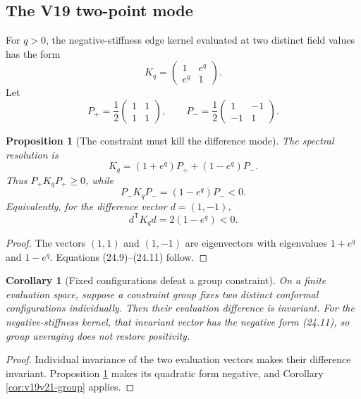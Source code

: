 \documentclass[11pt]{article}
\newtheorem{proposition}[theorem]{Proposition}
\newtheorem{corollary}[theorem]{Corollary}
\theoremstyle{remark}
\begin{document}
\subsection{The V19 two-point mode}

For \(q>0\), the negative-stiffness edge kernel evaluated at two distinct
field values has the form
\[
 K_q=
 \begin{pmatrix}1&e^q\\e^q&1\end{pmatrix}.                    \tag{24.7}
\]
Let
\[
 P_+=\frac12\begin{pmatrix}1&1\\1&1\end{pmatrix},
 \qquad
 P_-=\frac12\begin{pmatrix}1&-1\\-1&1\end{pmatrix}.             \tag{24.8}
\]

\begin{proposition}[The constraint must kill the difference mode]
\label{prop:v19v21-two-point}
The spectral resolution is
\[
 K_q=(1+e^q)P_+ +(1-e^q)P_-.                                  \tag{24.9}
\]
Thus \(P_+K_qP_+\geq0\), while
\[
 P_-K_qP_-=(1-e^q)P_-<0.                                      \tag{24.10}
\]
Equivalently, for the difference vector \(d=(1,-1)\),
\[
 d^{\mathsf T}K_qd=2(1-e^q)<0.                                \tag{24.11}
\]
\end{proposition}

\begin{proof}
The vectors \((1,1)\) and \((1,-1)\) are eigenvectors with eigenvalues
\(1+e^q\) and \(1-e^q\).  Equations (24.9)--(24.11) follow.
\end{proof}

\begin{corollary}[Fixed configurations defeat a group constraint]
\label{cor:v19v21-fixed}
On a finite evaluation space, suppose a constraint group fixes two
distinct conformal configurations individually.  Then their evaluation
difference is invariant.  For the negative-stiffness kernel, that
invariant vector has the negative form (24.11), so group averaging does
not restore positivity.
\end{corollary}

\begin{proof}
Individual invariance of the two evaluation vectors makes their
difference invariant.  Proposition \ref{prop:v19v21-two-point} makes its
quadratic form negative, and Corollary \ref{cor:v19v21-group} applies.
\end{proof}
\end{document}
